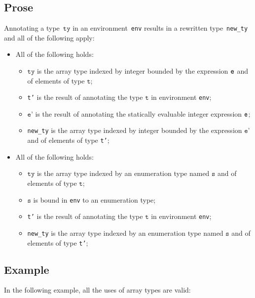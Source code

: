 \documentclass{book}
\newcommand\vt[0]{\texttt{t}}
\newcommand\vs[0]{\texttt{s}}
\newcommand\tty[0]{\texttt{ty}}
\newcommand\vep[0]{\texttt{e'}}
\begin{document}
\begin{itemize}
\subsection{Prose}
Annotating a type~$\tty$ in an environment~\texttt{env} results in a
rewritten type~\texttt{new\_ty} and all of the following apply:
\begin{itemize}
  \item All of the following holds:
    \begin{itemize}
      \item $\tty$ is the array type indexed by integer bounded by the
        expression $\texttt{e}$ and of elements of type $\vt$;
      \item \texttt{t'} is the result of annotating the type $\vt$ in
        environment \texttt{env};
      \item $\vep$ is the result of annotating the statically evaluable
        integer expression $\texttt{e}$;
      \item \texttt{new\_ty} is the array type indexed by integer bounded by
        the expression $\vep$ and of elements of type \texttt{t'};
    \end{itemize}
  \item All of the following holds:
    \begin{itemize}
      \item $\tty$ is the array type indexed by an enumeration type named
        $\vs$ and of elements of type $\vt$;
      \item $\vs$ is bound in \texttt{env} to an enumeration type;
      \item \texttt{t'} is the result of annotating the type $\vt$ in
        environment \texttt{env};
      \item \texttt{new\_ty} is the array type indexed by an enumeration type
        named $\vs$ and of elements of type \texttt{t'};
    \end{itemize}
\end{itemize}

\subsection{Example}
In the following example, all the uses of array types are valid:







\end{itemize}
\end{document}
